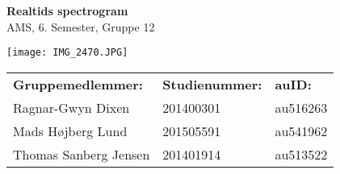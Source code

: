 \begingroup
\thispagestyle{empty}
\centering
\Huge{\textbf{Realtids spectrogram}}\\
{\Large AMS, 6. Semester, Gruppe 12}

\begin{center}
	\texttt{[image: IMG\_2470.JPG]}
\end{center}
{\small
	\begin{center}
		\begin{tabu} to 0.8\textwidth { X[l,2]  X[c,1] X[c,1] }
			\textbf{Gruppemedlemmer:}		& \textbf{Studienummer:}	& \textbf{auID:}\\
			Ragnar-Gwyn Dixen 		& 201400301		& au516263\\
			Mads Højberg Lund		& 201505591		& au541962\\
			Thomas Sanberg Jensen	& 201401914 	& au513522\\
		\end{tabu}
\end{center}}
\endgroup
\newpage
%